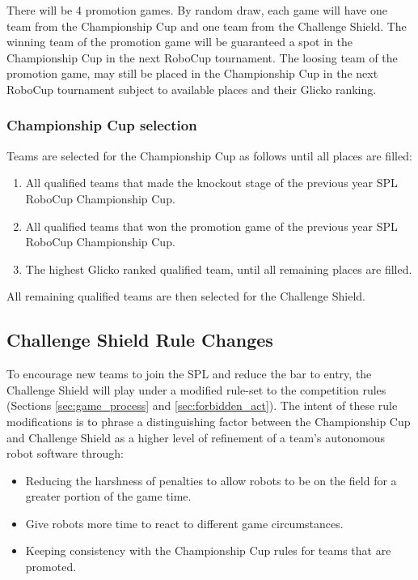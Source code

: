 There will be 4 promotion games. By random draw, each game will have one team from the Championship Cup and one team from the Challenge Shield. The winning team of the promotion game will be guaranteed a spot in the Championship Cup in the next RoboCup tournament. The loosing team of the promotion game, may still be placed in the Championship Cup in the next RoboCup tournament subject to available places and their Glicko ranking.


\subsubsection{Championship Cup selection}

Teams are selected for the Championship Cup as follows until all places are filled:
\begin{enumerate}
    \item All qualified teams that made the knockout stage of the previous year SPL RoboCup Championship Cup.
    \item All qualified teams that won the promotion game  of the previous year SPL RoboCup Championship Cup.
    \item The highest Glicko ranked qualified team, until all remaining places are filled.
\end{enumerate}

All remaining qualified teams are then selected for the Challenge Shield.


\subsection{Challenge Shield Rule Changes}
\label{sec:cs-rule-changes}

To encourage new teams to join the SPL and reduce the bar to entry, the Challenge Shield will play under a modified rule-set to the competition rules (Sections \ref{sec:game_process} and \ref{sec:forbidden_act}). The intent of these rule modifications is to phrase a distinguishing factor between the Championship Cup and Challenge Shield as a higher level of refinement of a team's autonomous robot software through:
\begin{itemize}
    \item Reducing the harshness of penalties to allow robots to be on the field for a greater portion of the game time.
    \item Give robots more time to react to different game circumstances.
    \item Keeping consistency with the Championship Cup rules for teams that are promoted.
\end{itemize}

